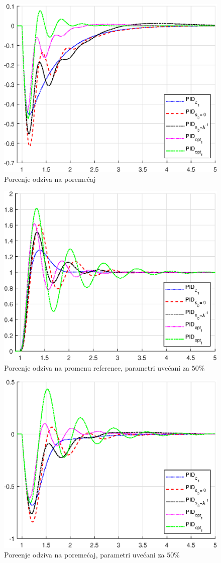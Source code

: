 \documentclass[a4paper,11pt]{article}
\theoremstyle{definition} \newtheorem{deff}{Definicija}[section]
\theoremstyle{definition} \newtheorem{prim}[deff]{Primer}
\theoremstyle{plain} \newtheorem{teor}[deff]{Teorema}
\begin{document}
	\begin{figure}[!h]
		\centering
		\includegraphics[width=0.6\linewidth]{slike/fm_comparison_default.eps}
		\caption{Pore\dj{}enje odziva na poreme\'caj}
		\label{fig:fm_default}
	\end{figure}
	
	\begin{figure}[!h]
		\centering
		\includegraphics[width=0.6\linewidth]{slike/Pg_comparison_+50.eps}
		\caption{Pore\dj{}enje odziva na promenu reference, parametri uve\'cani za $50\%$}
		\label{fig:Pg_50}
	\end{figure}
	
	\begin{figure}[!h]
		\centering
		\includegraphics[width=0.6\linewidth]{slike/fm_comparison_+50.eps}
		\caption{Pore\dj{}enje odziva na poreme\'caj, parametri uve\'cani za $50\%$}
		\label{fig:fm_50}
	\end{figure}
	
\end{document}
